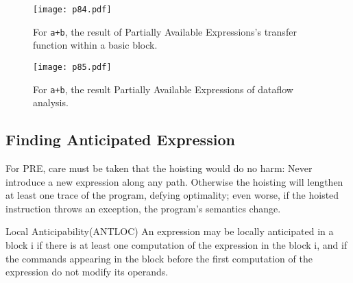 \begin{figure}[H]
	\centering
	\texttt{[image: p84.pdf]}
	\caption{For \texttt{a+b}, the result of  Partially Available Expressions's transfer function within a basic block.}
	\label{fig:p84}
\end{figure}



\begin{figure}[H]
	\centering
	\texttt{[image: p85.pdf]}
	\caption{For \texttt{a+b}, the result Partially Available Expressions of dataflow analysis.}
	\label{fig:p85}
\end{figure}

\subsection{Finding Anticipated Expression}

For PRE, care must be taken that the hoisting would do no harm: Never introduce
a new expression along any path. Otherwise the
hoisting will lengthen at least one trace of the program, defying optimality; even
worse, if the hoisted instruction throws an exception, the program’s semantics
change.



\begin{definition}{Local Anticipability(ANTLOC)}
	An expression may
	be locally anticipated in a block i if there is at least one
	computation of the expression in the block i, and if the
	commands appearing in the block before the first computation
	of the expression do not modify its operands.
\end{definition}


